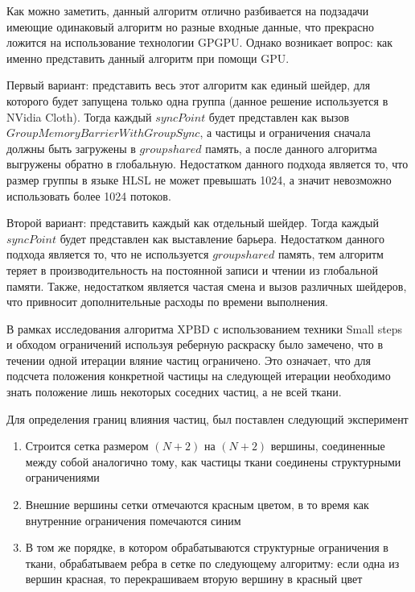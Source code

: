 	Как можно заметить, данный алгоритм отлично разбивается на подзадачи имеющие одинаковый алгоритм но разные входные данные, что прекрасно ложится на использование технологии GPGPU. Однако возникает вопрос: как именно представить данный алгоритм при помощи GPU.
	
	Первый вариант: представить весь этот алгоритм как единый шейдер, для которого будет запущена только одна группа (данное решение используется в NVidia Cloth). Тогда каждый $syncPoint$ будет представлен как вызов $GroupMemoryBarrierWithGroupSync$, а частицы и ограничения сначала должны быть загружены в $groupshared$ память, а после данного алгоритма выгружены обратно в глобальную. Недостатком данного подхода является то, что размер группы в языке HLSL не может превышать 1024, а значит невозможно использовать более 1024 потоков.
	
	Второй вариант: представить каждый  как отдельный шейдер. Тогда каждый $syncPoint$ будет представлен как выставление барьера. Недостатком данного подхода является то, что не используется $groupshared$ память, тем алгоритм теряет в производительность на постоянной записи и чтении из глобальной памяти. Также, недостатком является частая смена и вызов различных шейдеров, что привносит дополнительные расходы по времени выполнения.
	
	В рамках исследования алгоритма XPBD с использованием техники Small steps и обходом ограничений используя реберную раскраску было замечено, что в течении одной итерации вляние частиц ограничено. Это означает, что для подсчета положения конкретной частицы на следующей итерации необходимо знать положение лишь некоторых соседних частиц, а не всей ткани.
	
	Для определения границ влияния частиц, был поставлен следующий эксперимент
	\begin{enumerate}[1.]
		\item Строится сетка размером $(N+2)$ на $(N+2)$ вершины, соединенные между собой аналогично тому, как частицы ткани соединены структурными ограничениями
		\item Внешние вершины сетки отмечаются красным цветом, в то время как внутренние ограничения помечаются синим
		\item В том же порядке, в котором обрабатываются структурные ограничения в ткани, обрабатываем ребра в сетке по следующему алгоритму: если одна из вершин красная, то перекрашиваем вторую вершину в красный цвет
	\end{enumerate}
	
